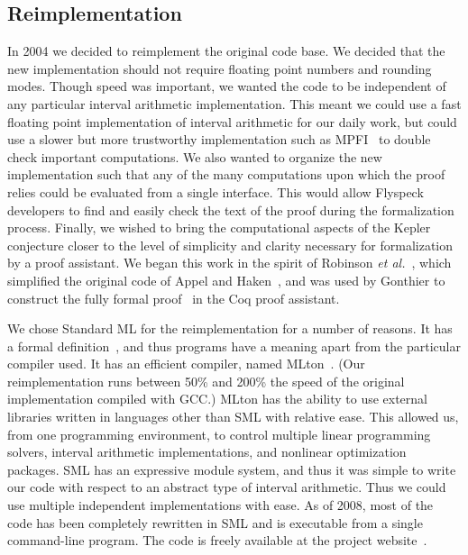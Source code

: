 \documentclass[11pt]{amsart}
\begin{document}

\subsection{Reimplementation}
\label{sec:sean}

In 2004 we decided to reimplement the original code
base.  We decided that the new implementation should not require 
floating point numbers and rounding modes.  Though speed
was important, we wanted the code to be independent of any particular
interval arithmetic implementation.  This meant we could use a fast
floating point implementation of interval arithmetic for our daily
work, but could use a slower but more trustworthy implementation such
as MPFI~\cite{Revol:2005:MPFI} to double check important computations.
We also wanted to organize the new implementation such that any of the
many computations upon which the proof relies could be evaluated from
a single interface.  This would allow Flyspeck developers to 
find and easily check the text of the proof during the formalization process.
Finally, we wished to bring the computational aspects of the
Kepler conjecture closer to the level of simplicity and clarity
necessary for formalization by a proof assistant.  We began this work
in the spirit of Robinson \textit{et
al.}~\cite{Robertson:1997:JCTB}, which simplified the original code of
Appel and Haken~\cite{Appel:1986:FourColor}, and was used by Gonthier
to construct the fully formal proof~\cite{gonthier:2008:formal} in the
Coq proof assistant.

We chose Standard ML for the reimplementation for a number of reasons.
It has a formal definition~\cite{Milner:1990:SML}, and thus programs
have a meaning apart from the particular compiler used.  It has an
efficient compiler, named MLton~\cite{website:MLton}.  (Our
reimplementation runs between 50\% and 200\% the speed of the original
implementation compiled with GCC.)  MLton has the ability to use
external libraries written in languages other than SML with relative
ease.  This allowed us, from one programming environment, to control multiple linear programming solvers,
interval arithmetic implementations, and nonlinear optimization
packages.
SML has an expressive module system, and thus it was simple to write
our code with respect to an abstract type of interval arithmetic. 
Thus we could use multiple independent implementations
with ease.  As of 2008, most of the code has been completely
rewritten in SML and is executable
from a single command-line program.  The code is freely available
at the project website~\cite{McLaughlin:2008:KeplerCode}.
\end{document}
